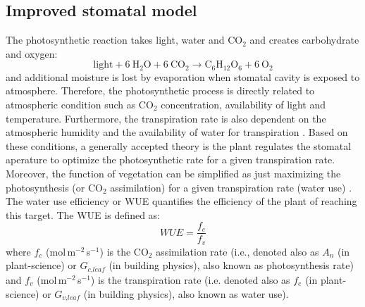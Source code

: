 \subsection{Improved stomatal model}

The photosynthetic reaction takes light, water and CO$_2$ and creates carbohydrate and oxygen:
\begin{equation}
\mathrm{light} + 6~\mathrm{H}_2\mathrm{O} + 6~\mathrm{C}\mathrm{O}_2 \rightarrow \mathrm{C}_6\mathrm{H}_{12}\mathrm{O}_6  + 6~\mathrm{O}_2 
\end{equation}
and additional moisture is lost by evaporation when stomatal cavity is exposed to atmosphere. Therefore, the photosynthetic process is directly related to atmospheric condition such as CO$_2$ concentration, availability of light and temperature. Furthermore, the transpiration rate is also dependent on the atmospheric humidity and the availability of water for transpiration \citep{Ball1987,Leuning1995}. Based on these conditions, a generally accepted theory is the plant regulates the stomatal aperature to optimize the photosynthetic rate for a given transpiration rate. Moreover, the function of vegetation can be simplified as just maximizing the photosynthesis (or CO$_2$ assimilation) for a given transpiration rate (water use) \citep{Medlyn2011}. The water use efficiency or WUE quantifies the efficiency of the plant of reaching this target. The WUE is defined as:
\begin{equation}
\textit{WUE} = \frac{f_c}{f_v}
\end{equation}
where $f_c$ (mol\,m$^{-2}$\,s$^{-1}$) is the CO$_2$ assimilation rate (i.e., denoted also as $A_n$ (in plant-science) or $G_{\textit{c,leaf}}$ (in building physics), also known as photosynthesis rate) and $f_v$  (mol\,m$^{-2}$\,s$^{-1}$) is the transpiration rate (i.e. denoted also as $f_e$ (in plant-science) or $G_{\textit{v,leaf}}$ (in building physics), also known as water use).  

